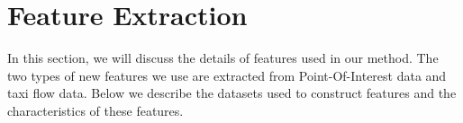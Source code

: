 
\section{Feature Extraction}
\label{ch2-sec:feature}

In this section, we will discuss the details of features used in our method. The two types of new features we use are extracted from Point-Of-Interest data and taxi flow data. Below we describe the datasets used to construct features and the characteristics of these features.

\begin{figure}[t]
\centering
{}

\end{figure}
